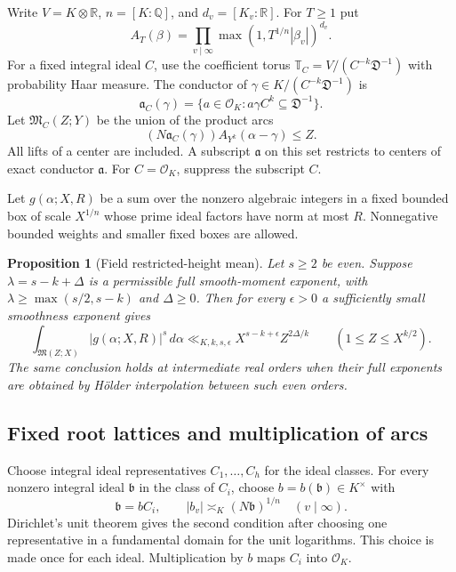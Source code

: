 \documentclass[11pt]{amsart}
\newtheorem{proposition}[theorem]{Proposition}
\theoremstyle{definition}
\numberwithin{equation}{section}
\begin{document}
Write $V=K\otimes\mathbb R$, $n=[K:\mathbb Q]$, and $d_v=[K_v:\mathbb R]$.
For $T\ge1$ put
\[
 A_T(\beta)=\prod_{v\mid\infty}
                 \max(1,T^{1/n}|\beta_v|)^{d_v}.
\]
For a fixed integral ideal $C$, use the coefficient torus
$\mathbb T_C=V/(C^{-k}\mathfrak D^{-1})$ with probability Haar measure.
The conductor of $\gamma\in K/(C^{-k}\mathfrak D^{-1})$ is
\[
 \mathfrak a_C(\gamma)
       =\{a\in\mathcal O_K:a\gamma C^k\subseteq\mathfrak D^{-1}\}.
\]
Let $\mathfrak M_C(Z;Y)$ be the union of the product arcs
\[
 (N\mathfrak a_C(\gamma)) A_{Y^k}(\alpha-\gamma)\le Z.
\]
All lifts of a center are included.  A subscript $\mathfrak a$ on this
set restricts to centers of exact conductor $\mathfrak a$.
For $C=\mathcal O_K$, suppress the subscript $C$.

Let $g(\alpha;X,R)$ be a sum over the nonzero algebraic integers in a fixed
bounded box of scale $X^{1/n}$ whose prime ideal factors have norm at most
$R$.  Nonnegative bounded weights and smaller fixed boxes are allowed.

\begin{proposition}[Field restricted-height mean]
\label{prop:restricted-field}
Let $s\ge2$ be even.  Suppose $\lambda=s-k+\Delta$ is a permissible
full smooth-moment exponent, with
$\lambda\ge\max(s/2,s-k)$ and $\Delta\ge0$.  Then for every
$\epsilon>0$ a sufficiently small smoothness exponent gives
\[
 \int_{\mathfrak M(Z;X)}|g(\alpha;X,R)|^s\,d\alpha
       \ll_{K,k,s,\epsilon} X^{s-k+\epsilon}Z^{2\Delta/k}
       \qquad(1\le Z\le X^{k/2}).
\]
The same conclusion holds at intermediate real orders when their full
exponents are obtained by H\"older interpolation between such even orders.
\end{proposition}

\subsection{Fixed root lattices and multiplication of arcs}

Choose integral ideal representatives $C_1,\ldots,C_h$ for the ideal
classes.  For every nonzero integral ideal $\mathfrak b$ in the class of
$C_i$, choose $b=b(\mathfrak b)\in K^\times$ with
\[
 \mathfrak b=b C_i,\qquad
 |b_v|\asymp_K(N\mathfrak b)^{1/n}\quad(v\mid\infty).
\]
Dirichlet's unit theorem gives the second condition after choosing one
representative in a fundamental domain for the unit logarithms.  This
choice is made once for each ideal.  Multiplication by $b$ maps $C_i$
into $\mathcal O_K$.
\end{document}
